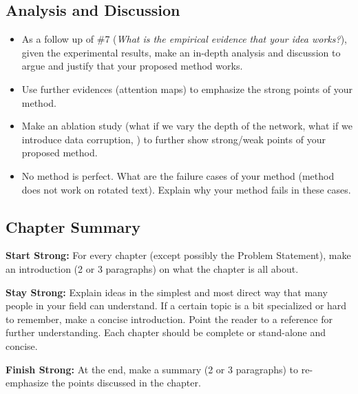 \begin{singlespace}
    \chapter{Analysis and Discussion}
    \label{ch:analysis}
\end{singlespace}

\begin{itemize}
    \item As a follow up of \#7 (\emph{What is the empirical evidence that your idea works?}), given the experimental results, make an in-depth analysis and discussion to argue and justify that your proposed method works.
    \item Use further evidences (\eg attention maps) to emphasize the strong points of your method.
    \item Make an ablation study (\eg what if we vary the depth of the network, what if we introduce data corruption, \etc) to further show strong/weak points of your proposed method.
    \item No method is perfect. What are the failure cases of your method (\eg method does not work on rotated text). Explain why your method fails in these cases.
\end{itemize}

\section{Chapter Summary}

\textbf{Start Strong:} For every chapter (except possibly the Problem Statement), make an introduction (2 or 3 paragraphs) on what the chapter is all about.

\textbf{Stay Strong:} Explain ideas in the simplest and most direct way that many people in your field can understand. If a certain topic is a bit specialized or hard to remember, make a concise introduction. Point the reader to a reference for further understanding. Each chapter should be complete or stand-alone and concise.

\textbf{Finish Strong:} At the end, make a summary (2 or 3 paragraphs) to re-emphasize the points discussed in the chapter.
